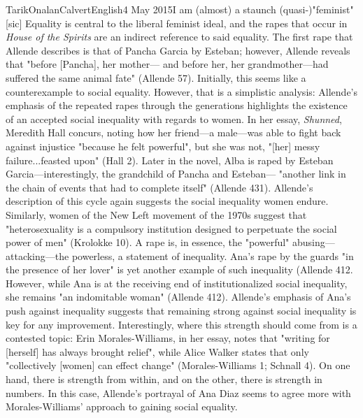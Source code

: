 \documentclass[12pt,a4paper]{article}
\begin{document}
\begin{mla}{Tarik}{Onalan}{Calvert}{English}{4 May 2015}{I am (almost) a staunch (quasi-)"feminist" [sic]}
        Equality is central to the liberal feminist ideal, and the rapes that occur in \textit{House
        of the Spirits} are an indirect reference to said equality. The first rape that Allende describes
        is that of Pancha Garcia by Esteban; however, Allende reveals that "before [Pancha], her mother---
        and before her, her grandmother---had suffered the same animal fate" (Allende 57). Initially,
        this seems like a counterexample to social equality. However, that is a simplistic analysis:
        Allende's emphasis of the repeated rapes through the generations highlights the existence of
        an accepted social inequality with regards to women. In her essay, \textit{Shunned}, Meredith
        Hall concurs, noting how her friend---a male---was able to fight back against injustice "because
        he felt powerful", but she was not, "[her] messy failure...feasted upon" (Hall 2). Later in the
        novel, Alba is raped by Esteban Garcia---interestingly, the grandchild of Pancha and Esteban---
        "another link in the chain of events that had to complete itself" (Allende 431). Allende's
        description of this cycle again suggests the social inequality women endure. Similarly, women
        of the New Left movement of the 1970s suggest that "heterosexuality is a compulsory institution
        designed to perpetuate the social power of men" (Krolokke 10). A rape is, in essence, the "powerful"
        abusing---attacking---the powerless, a statement of inequality. Ana's rape by the guards "in
        the presence of her lover" is yet another example of such inequality (Allende 412. However,
        while Ana is at the receiving end of institutionalized social inequality, she remains "an
        indomitable woman" (Allende 412). Allende's emphasis of Ana's push against inequality suggests
        that remaining strong against social inequality is key for any improvement. Interestingly, where
        this strength should come from is a contested topic: Erin Morales-Williams, in her essay, notes
        that "writing for [herself] has always brought relief", while Alice Walker states that only
        "collectively [women] can effect change" (Morales-Williams 1; Schnall 4). On one hand, there
        is strength from within, and on the other, there is strength in numbers. In this case, Allende's
        portrayal of Ana Diaz seems to agree more with Morales-Williams' approach to gaining social
        equality.


\end{mla}
\end{document}

